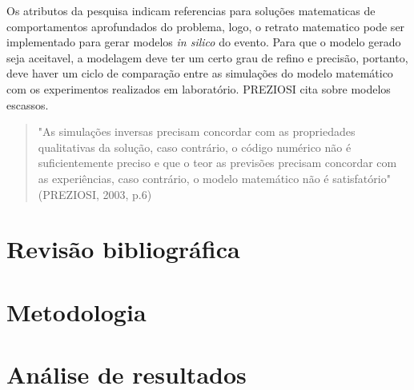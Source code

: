\documentclass[12pt]{article}
\begin{document}
Os atributos da pesquisa indicam referencias para soluções matematicas de comportamentos aprofundados do problema, logo, o retrato matematico pode ser implementado para gerar modelos \emph{in silico} do evento. Para que o modelo gerado seja aceitavel, a modelagem deve ter um certo grau de refino e precisão, portanto, deve haver um ciclo de comparação entre as simulações do modelo matemático com os experimentos realizados em laboratório. PREZIOSI cita sobre modelos escassos. \begin{quotation}
"As simulações inversas precisam concordar com as propriedades qualitativas da solução, caso contrário, o código numérico não é suficientemente preciso e que o teor as previsões precisam concordar com as experiências, caso contrário, o modelo matemático não é satisfatório" (PREZIOSI, 2003, p.6)
\end{quotation}






\section{Revisão bibliográfica} %


\section{Metodologia} %



\section{Análise de resultados}
\end{document}
